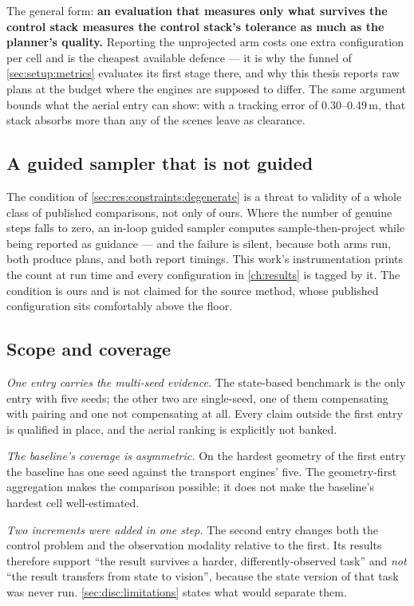 The general form: \textbf{an evaluation that measures only what survives the control stack measures
the control stack's tolerance as much as the planner's quality.} Reporting the unprojected arm costs
one extra configuration per cell and is the cheapest available defence --- it is why the funnel of
\autoref{sec:setup:metrics} evaluates its first stage there, and why this thesis reports raw plans at
the budget where the engines are supposed to differ. The same argument bounds what the aerial entry
can show: with a tracking error of 0.30--0.49\,m, that stack absorbs more than any of the scenes
leave as clearance.

\subsection*{A guided sampler that is not guided}

The condition of \autoref{sec:res:constraints:degenerate} is a threat to validity of a whole class of
published comparisons, not only of ours. Where the number of genuine steps falls to zero, an in-loop
guided sampler computes sample-then-project while being reported as guidance --- and the failure is
silent, because both arms run, both produce plans, and both report timings. This work's
instrumentation prints the count at run time and every configuration in \autoref{ch:results} is
tagged by it. The condition is ours and is not claimed for the source method, whose published
configuration sits comfortably above the floor.

\subsection*{Scope and coverage}

\emph{One entry carries the multi-seed evidence.} The state-based benchmark is the only entry with
five seeds; the other two are single-seed, one of them compensating with pairing and one not
compensating at all. Every claim outside the first entry is qualified in place, and the aerial
ranking is explicitly not banked.

\emph{The baseline's coverage is asymmetric.} On the hardest geometry of the first entry the
baseline has one seed against the transport engines' five. The geometry-first aggregation makes the
comparison possible; it does not make the baseline's hardest cell well-estimated.

\emph{Two increments were added in one step.} The second entry changes both the control problem and
the observation modality relative to the first. Its results therefore support ``the result survives
a harder, differently-observed task'' and \emph{not} ``the result transfers from state to vision'',
because the state version of that task was never run. \autoref{sec:disc:limitations} states what
would separate them.

